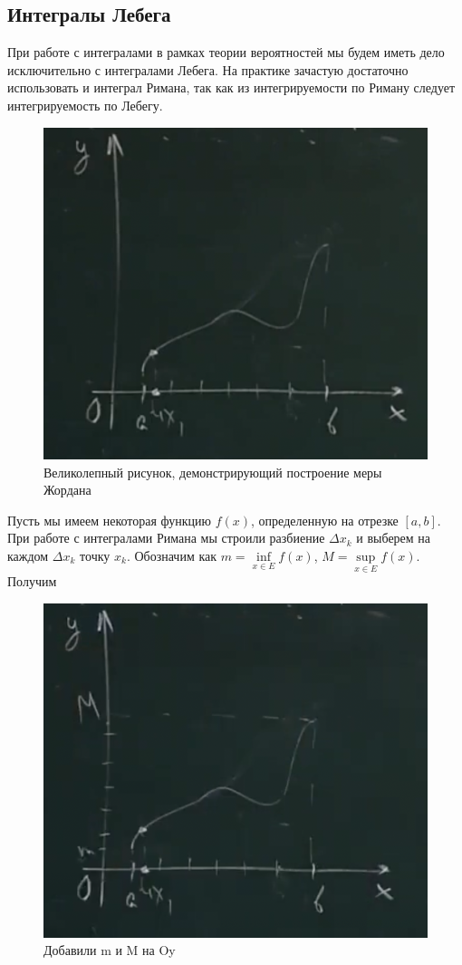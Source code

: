 \subsection{Интегралы Лебега}
При работе с интегралами в рамках теории вероятностей
мы будем иметь дело исключительно с интегралами Лебега.
На практике зачастую достаточно использовать и 
интеграл Римана, так как из интегрируемости по Риману
следует интегрируемость по Лебегу.
\begin{figure}[H]
    \centering
    \includegraphics[scale=0.5]{images/riemann.png}
    \caption{Великолепный рисунок, демонстрирующий построение 
    меры Жордана}
\end{figure}

Пусть мы имеем некоторая функцию $f(x)$, определенную на отрезке $[a, b]$.
При работе с интегралами Римана мы строили разбиение $\Delta x_k$ и выберем на каждом $\Delta x_k$
точку $x_k$.
Обозначим как 
$m = \inf\limits_{x \in E} f(x)$, $M = \sup\limits_{x \in E} f(x)$.
Получим
\begin{figure}[H]
    \centering
    \includegraphics[scale=0.5]{images/lebeg.png}
    \caption{Добавили m и M на Oy}
\end{figure}

